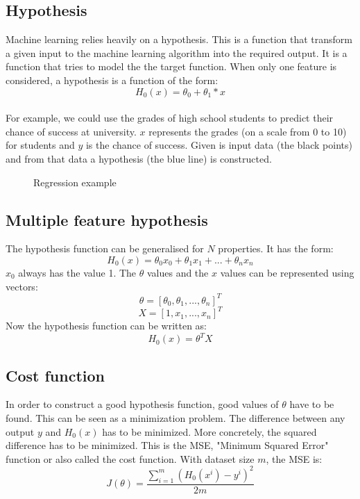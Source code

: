 \subsection{Hypothesis}
Machine learning relies heavily on a hypothesis. This is a function that transform a given input to the machine learning algorithm into the required output. It is a function that tries to model the the target function. When only one feature is considered, a hypothesis is a function of the form: 
$$H_0(x) = \theta_0 + \theta_1 * x$$
 \\
For example, we could use the grades of high school students to predict their chance of success at university. $x$ represents the grades (on a scale from 0 to 10) for students and $y$ is the chance of success. Given is input data (the black points) and from that data a hypothesis (the blue line) is constructed.

\begin{figure}
\centering
{}
\caption{Regression example} \label{fig:regression}
\end{figure}
\subsection{Multiple feature hypothesis}
\noindent The hypothesis function can be generalised for $N$ properties. It has the form:
$$H_0(x) = \theta_0x_0 + \theta_1x_1 + ... + \theta_nx_n$$
$x_0$ always has the value 1. The $\theta$ values and the $x$ values can be represented using vectors:
$$\theta = [\theta_0, \theta_1, ..., \theta_n]^T$$
$$X = [1, x_1, ... ,x_n]^T$$
Now the hypothesis function can be written as:
$$H_0(x) = \theta^TX$$
\subsection{Cost function}
In order to construct a good hypothesis function, good values of $\theta$ have to be found. This can be seen as a minimization problem. The difference between any output $y$ and $H_0(x)$ has to be minimized. More concretely, the squared difference has to be minimized. This is the MSE, "Minimum Squared Error" function or also called the cost function. With dataset size $m$, the MSE is:
$$J(\theta) = \dfrac{\sum\limits_{i=1}^m(H_0(x^i) - y^i)^2}{2m}$$

